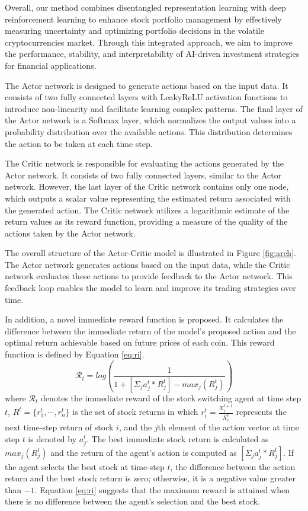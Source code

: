 Overall, our method combines disentangled representation learning with deep reinforcement learning to enhance stock portfolio management by effectively measuring uncertainty and optimizing portfolio decisions in the volatile cryptocurrencies market. Through this integrated approach, we aim to improve the performance, stability, and interpretability of AI-driven investment strategies for financial applications.

The Actor network is designed to generate actions based on the input data. It consists of two fully connected layers with LeakyReLU activation functions to introduce non-linearity and facilitate learning complex patterns. The final layer of the Actor network is a Softmax layer, which normalizes the output values into a probability distribution over the available actions. This distribution determines the action to be taken at each time step.

The Critic network is responsible for evaluating the actions generated by the Actor network. It consists of two fully connected layers, similar to the Actor network. However, the last layer of the Critic network contains only one node, which outputs a scalar value representing the estimated return associated with the generated action. The Critic network utilizes a logarithmic estimate of the return values as its reward function, providing a measure of the quality of the actions taken by the Actor network.

The overall structure of the Actor-Critic model is illustrated in Figure \ref{fig:arch}. The Actor network generates actions based on the input data, while the Critic network evaluates these actions to provide feedback to the Actor network. This feedback loop enables the model to learn and improve its trading strategies over time.


In addition, a novel immediate reward function is proposed. It calculates the difference between the immediate return of the model's proposed action and the optimal return achievable based on future prices of each coin. This reward function is defined by Equation \eqref{eq:ri}.
\begin{equation}
	\mathcal{R}_t = log(\frac{1}{1 + [\Sigma_{j} a_j^t * R_j^t] - max_j(R_j^t)})
	\label{eq:ri}
\end{equation}
where $\mathcal{R}_t$ denotes the immediate reward of the stock switching agent at time step $t$, $R^t = \{r_1^t, \cdots, r_n^t\}$ is the set of stock returns in which $r_i^t = \frac{X_i^{t+1}}{X_i^t}$ represents the next time-step return of stock $i$, and the $j$th element of the action vector at time step $t$ is denoted by $a_j^t$. The best immediate stock return is calculated as $max_j(R_j^t)$ and the return of the agent's action is computed as $ [\Sigma_{j} a_j^t * R_j^t]$. If the agent selects the best stock at time-step $t$, the difference between the action return and the best stock return is zero; otherwise, it is a negative value greater than $-1$. Equation \eqref{eq:ri} suggests that the maximum reward is attained when there is no difference between the agent's selection and the best stock.